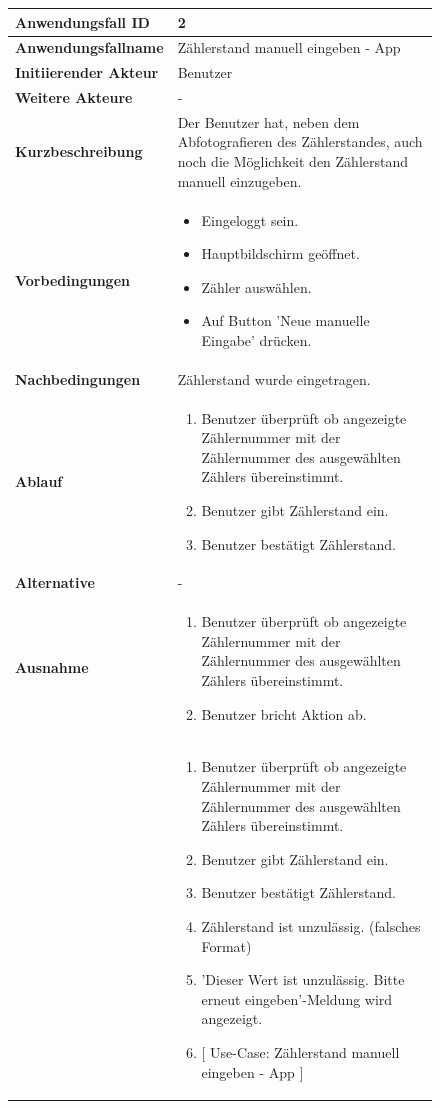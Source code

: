 \newpage

\begin{figure}[h]
	\centering
	\begin{tabularx}{\textwidth}{ X | X }
		\textbf{Anwendungsfall ID} & 2 \\ \hline
		\textbf{Anwendungsfallname} & Zählerstand manuell eingeben - App \\ \hline
		\textbf{Initiierender Akteur} & Benutzer \\ \hline
		\textbf{Weitere Akteure} & - \\ \hline
		\textbf{Kurzbeschreibung} & Der Benutzer hat, neben dem Abfotografieren des Zählerstandes, auch noch die Möglichkeit den Zählerstand manuell 									einzugeben.  \\ \hline
		\textbf{Vorbedingungen} & 
		\begin {itemize}
			\item Eingeloggt sein. 
			\item Hauptbildschirm geöffnet.
			\item Zähler auswählen.
			\item Auf Button 'Neue manuelle Eingabe' drücken.
		\end{itemize}\\ \hline
		\textbf{Nachbedingungen} & Zählerstand wurde eingetragen.  \\ \hline
		\textbf{Ablauf} &
		\begin{enumerate}
			\item Benutzer überprüft ob angezeigte Zählernummer mit der Zählernummer des ausgewählten Zählers übereinstimmt.
			\item Benutzer gibt Zählerstand ein.
			\item Benutzer bestätigt Zählerstand.
		\end{enumerate} \\ \hline
		\textbf{Alternative} & - \\ \hline
		\textbf{Ausnahme} &
		\begin{enumerate}
			\item Benutzer überprüft ob angezeigte Zählernummer mit der Zählernummer des ausgewählten Zählers übereinstimmt.
			\item Benutzer bricht Aktion ab.
		\end{enumerate}  \\  &
		\begin{enumerate}
			\item Benutzer überprüft ob angezeigte Zählernummer mit der Zählernummer des ausgewählten Zählers übereinstimmt.
			\item Benutzer gibt Zählerstand ein.
			\item Benutzer bestätigt Zählerstand.
			\item Zählerstand ist unzulässig. (falsches Format)
			\item 'Dieser Wert ist unzulässig. Bitte erneut eingeben'-Meldung wird angezeigt. 
 			\item $\lbrack$ Use-Case: Zählerstand manuell eingeben - App $\rbrack$
		\end{enumerate} \\


	\end{tabularx}
\end{figure}

